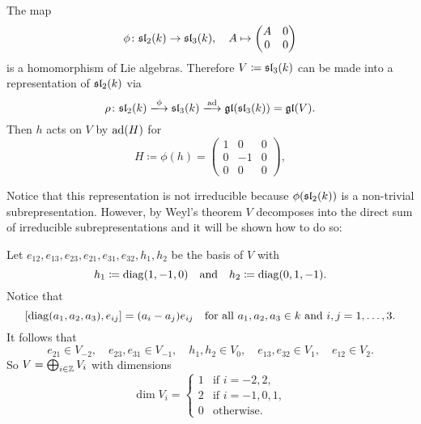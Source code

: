 \begin{expl}
 The map
 \[
  \phi \colon \mathfrak{sl}_2(k) \to \mathfrak{sl}_3(k), \quad
  A \mapsto \begin{pmatrix} A & 0 \\ 0 & 0 \end{pmatrix}
 \]
 is a homomorphism of Lie algebras. Therefore $V \coloneqq \mathfrak{sl}_3(k)$ can be made into a representation of $\mathfrak{sl}_2(k)$ via
 \[
  \rho \colon \sll_2(k) \xlongrightarrow{\phi} \sll_3(k) \xlongrightarrow{\ad} \gl(\sll_3(k)) = \gl(V).
 \]
 Then $h$ acts on $V$ by $\operatorname{ad}(H)$ for
 \[
  H \coloneqq \phi(h) =
  \begin{pmatrix}
   1 &  0 & 0 \\
   0 & -1 & 0 \\
   0 &  0 & 0
  \end{pmatrix},
 \]

 Notice that this representation is not irreducible because $\phi(\mathfrak{sl}_2(k))$ is a non-trivial subrepresentation. However, by Weyl’s theorem $V$ decomposes into the direct sum of irreducible subrepresentations and it will be shown how to do so:
 
 Let $e_{12}, e_{13}, e_{23}, e_{21}, e_{31}, e_{32}, h_1, h_2$ be the basis of $V$ with
 \[
  h_1 \coloneqq \operatorname{diag}(1, -1, 0) \quad\text{and}\quad h_2 \coloneqq \operatorname{diag}(0, 1, -1).
 \]
 Notice that
 \[
  [\operatorname{diag}(a_1, a_2, a_3), e_{ij}] = (a_i-a_j) e_{ij}
  \quad\text{for all $a_1, a_2, a_3 \in k$ and $i,j = 1, \dotsc, 3$}.
 \]
 It follows that
 \[
  e_{21} \in V_{-2}, \quad
  e_{23}, e_{31} \in V_{-1}, \quad
  h_1, h_2 \in V_0, \quad
  e_{13}, e_{32} \in V_1, \quad
  e_{12} \in V_2.
 \]
 So $V = \bigoplus_{i \in \mathbb{Z}} V_i$ with dimensions
 \begin{equation}\label{eqn: dimensions of eigenspaces of sl3}
  \dim V_i =
  \begin{cases}
   1 & \text{if $i = -2, 2$}, \\
   2 & \text{if $i = -1, 0, 1$}, \\
   0 & \text{otherwise}.
  \end{cases}
 \end{equation}
 

\end{expl}
